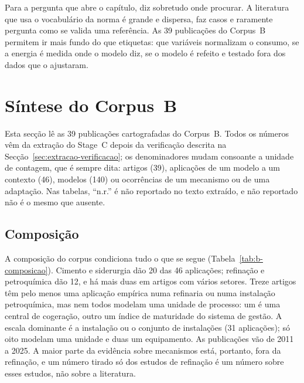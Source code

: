 
Para a pergunta que abre o capítulo,  diz
sobretudo onde procurar.
A literatura que usa o vocabulário da norma é grande e dispersa, faz casos
e raramente pergunta como se valida uma referência. As 39 publicações do
Corpus~B permitem ir mais fundo do que etiquetas: que variáveis normalizam o
consumo, se a energia é medida onde o modelo diz, se o modelo é refeito e
testado fora dos dados que o ajustaram.

\section{Síntese do Corpus~B}
\label{sec:corpus-b}

Esta secção lê as 39 publicações cartografadas do Corpus~B. Todos os números
vêm da extração do Stage~C depois da verificação descrita na
Secção~\ref{sec:extracao-verificacao}; os denominadores mudam consoante a
unidade de contagem, que é sempre dita: artigos (39), aplicações de um
modelo a um contexto (46), modelos (140) ou ocorrências de um mecanismo ou de
uma adaptação. Nas tabelas, ``n.r.'' é não reportado no texto extraído, e
não reportado não é o mesmo que ausente.

\subsection{Composição}

A composição do corpus condiciona tudo o que se segue
(Tabela~\ref{tab:b-composicao}). Cimento e siderurgia dão 20 das 46
aplicações; refinação e petroquímica dão 12, e há mais duas em artigos com
vários setores. Treze artigos têm pelo menos uma aplicação empírica numa
refinaria ou numa instalação petroquímica, mas nem todos modelam uma
unidade de processo: um é uma central de cogeração, outro um índice de
maturidade do sistema de gestão. A escala dominante é a instalação ou o
conjunto de instalações (31 aplicações); só oito modelam uma unidade e
duas um equipamento. As publicações vão de 2011 a 2025. A maior parte da
evidência sobre mecanismos está, portanto, fora da refinação, e um número
tirado só dos estudos de refinação é um número sobre esses estudos, não
sobre a literatura.

